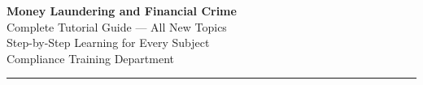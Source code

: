 \documentclass[12pt,aspectratio=169]{beamer}
\begin{document}
	
	\begin{frame}
		\centering
		\vspace{0.8cm}
		{\fontsize{20}{24}\selectfont \textbf{Money Laundering and Financial Crime}}\\[0.2cm]
		{\fontsize{15}{18}\selectfont Complete Tutorial Guide — All New Topics}\\[0.4cm]
		{\fontsize{12}{14}\selectfont Step-by-Step Learning for Every Subject}\\[0.4cm]
		{\fontsize{10}{12}\selectfont Compliance Training Department}
		\vspace{0.3cm}
		\rule{5cm}{1pt}
	\end{frame}
	
\end{document}
